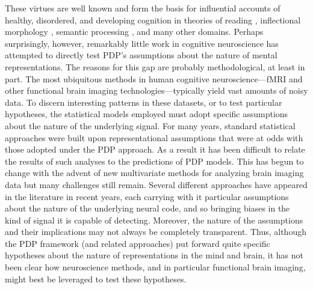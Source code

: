 These virtues are well known and form the basis for influential accounts of healthy, disordered, and developing cognition in theories of reading \cite{patterson_connections_1989, seidenberg_distributed_1989}, inflectional morphology \cite{bird_deficits_2003, patterson_deficits_2001, plunkett_connectionist_1999}, semantic processing \cite{hoffman_semantic_2011,lambon_ralph_neural_2007,rogers_semantic_2004}, and many other domains. Perhaps surprisingly, however, remarkably little work in cognitive neuroscience has attempted to directly test PDP's assumptions about the nature of mental representations. The reasons for this gap are probably methodological, at least in part. The most ubiquitous methods in human cognitive neuroscience---fMRI and other functional brain imaging technologies---typically yield vast amounts of noisy data.  To discern interesting patterns in these datasets, or to test particular hypotheses, the statistical models employed must adopt specific assumptions about the nature of the underlying signal. For many years, standard statistical approaches were built upon representational assumptions that were at odds with those adopted under the PDP approach. As a result it has been difficult to relate the results of such analyses to the predictions of PDP models. This has begun to change with the advent of new multivariate methods for analyzing brain imaging data but many challenges still remain. Several different approaches have appeared in the literature in recent years, each carrying with it particular assumptions about the nature of the underlying neural code, and so bringing biases in the kind of signal it is capable of detecting. Moreover, the nature of the assumptions and their implications may not always be completely transparent. Thus, although the PDP framework (and related approaches) put forward quite specific hypotheses about the nature of representations in the mind and brain, it has not been clear how neuroscience methods, and in particular functional brain imaging, might best be leveraged to test these hypotheses.

